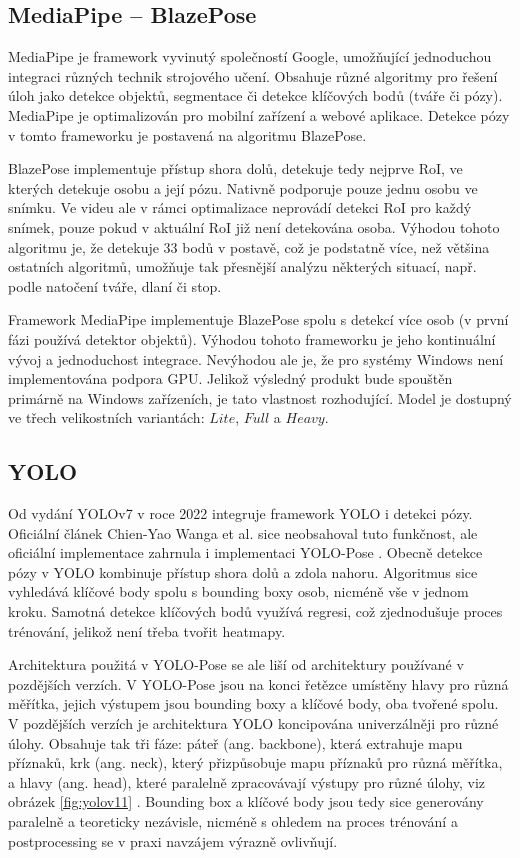 \subsection{MediaPipe – BlazePose}

MediaPipe je framework vyvinutý společností Google, umožňující jednoduchou
integraci různých technik strojového učení. Obsahuje různé algoritmy pro řešení
úloh jako detekce objektů, segmentace či detekce klíčových bodů (tváře či
pózy). MediaPipe je optimalizován pro mobilní zařízení a webové aplikace.
Detekce pózy v tomto frameworku je postavená na algoritmu BlazePose.

BlazePose implementuje přístup shora dolů, detekuje tedy nejprve RoI, ve
kterých detekuje osobu a její pózu. Nativně podporuje pouze jednu osobu ve
snímku. Ve videu ale v rámci optimalizace neprovádí detekci RoI pro každý
snímek, pouze pokud v aktuální RoI již není detekována osoba. Výhodou tohoto
algoritmu je, že detekuje 33 bodů v postavě, což je podstatně více, než většina
ostatních algoritmů, umožňuje tak přesnější analýzu některých situací, např.
podle natočení tváře, dlaní či stop.

Framework MediaPipe implementuje BlazePose spolu s detekcí více osob (v první
fázi používá detektor objektů). Výhodou tohoto frameworku je jeho kontinuální
vývoj a jednoduchost integrace. Nevýhodou ale je, že pro systémy Windows není
implementována podpora GPU. Jelikož výsledný produkt bude spouštěn primárně na
Windows zařízeních, je tato vlastnost rozhodující. Model je dostupný ve třech
velikostních variantách: $Lite$, $Full$ a $Heavy$.

\subsection{YOLO}

Od vydání YOLOv7 v roce 2022 integruje framework YOLO i detekci pózy. Oficiální
článek Chien-Yao Wanga et al. \cite{yolov7} sice neobsahoval tuto funkčnost,
ale oficiální implementace zahrnula i implementaci YOLO-Pose \cite{yolo-pose}.
Obecně detekce pózy v YOLO kombinuje přístup shora dolů a zdola nahoru.
Algoritmus sice vyhledává klíčové body spolu s bounding boxy osob, nicméně vše
v jednom kroku. Samotná detekce klíčových bodů využívá regresi, což
zjednodušuje proces trénování, jelikož není třeba tvořit heatmapy.

Architektura použitá v YOLO-Pose se ale liší od architektury používané v
pozdějších verzích. V YOLO-Pose jsou na konci řetězce umístěny hlavy pro různá
měřítka, jejich výstupem jsou bounding boxy a klíčové body, oba tvořené spolu.
V pozdějších verzích je architektura YOLO koncipována univerzálněji pro různé
úlohy. Obsahuje tak tři fáze\cite{yolov11}: páteř (ang. backbone), která
extrahuje mapu příznaků, krk (ang. neck), který přizpůsobuje mapu příznaků pro
různá měřítka, a hlavy (ang. head), které paralelně zpracovávají výstupy pro
různé úlohy, viz obrázek \ref{fig:yolov11} . Bounding box a klíčové body jsou
tedy sice generovány paralelně a teoreticky nezávisle, nicméně s ohledem na
proces trénování a postprocessing se v praxi navzájem výrazně ovlivňují.

